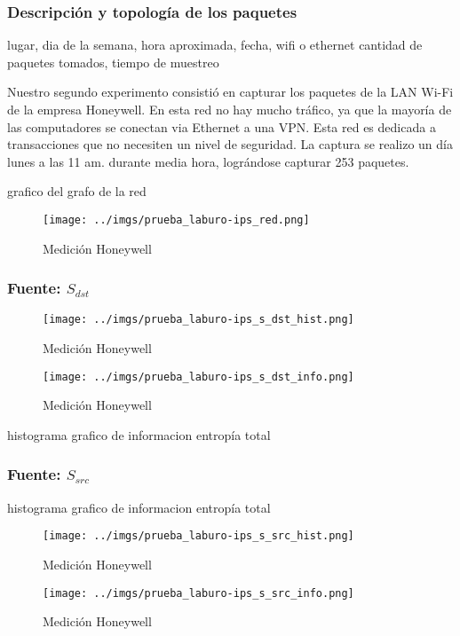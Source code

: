 \subsubsection{Descripción y topología de los paquetes}

lugar, dia de la semana, hora aproximada, fecha, wifi o ethernet
cantidad de paquetes tomados, tiempo de muestreo

Nuestro segundo experimento consistió en capturar los paquetes de la LAN Wi-Fi de la empresa Honeywell. En esta red no hay mucho tráfico, ya que la mayoría de las computadores se conectan via Ethernet a una VPN. Esta red es dedicada a transacciones que no necesiten un nivel de seguridad. La captura se realizo un día lunes a las 11 am. durante media hora, lográndose capturar 253 paquetes.  

grafico del grafo de la red

\begin{figure}[H]
 \begin{center}
  \texttt{[image: ../imgs/prueba\_laburo-ips\_red.png]}
  \caption{Medición Honeywell}
 \end{center}
\end{figure}


\subsubsection{Fuente: $S_{dst}$}

\begin{figure}[H]
   \begin{minipage}{0.5\linewidth}
     \texttt{[image: ../imgs/prueba\_laburo-ips\_s\_dst\_hist.png]}
     \caption{Medición Honeywell}\label{fig:Honeywell-dst-hist}
   \end{minipage}
  \hfill
   \begin{minipage}{0.5\linewidth}
     \texttt{[image: ../imgs/prueba\_laburo-ips\_s\_dst\_info.png]}
     \caption{Medición Honeywell}\label{fig:Honeywell-dst-info}
   \end{minipage}
 \end{figure}

histograma
grafico de informacion
entropía total

\subsubsection{Fuente: $S_{src}$}

histograma
grafico de informacion
entropía total

\begin{figure}[H]
   \begin{minipage}{0.5\linewidth}
     \texttt{[image: ../imgs/prueba\_laburo-ips\_s\_src\_hist.png]}
     \caption{Medición Honeywell}\label{fig:Honeywell-src-hist}
   \end{minipage}
  \hfill
   \begin{minipage}{0.5\linewidth}
     \texttt{[image: ../imgs/prueba\_laburo-ips\_s\_src\_info.png]}
     \caption{Medición Honeywell}\label{fig:Honeywell-src-  info}
   \end{minipage}
 \end{figure}